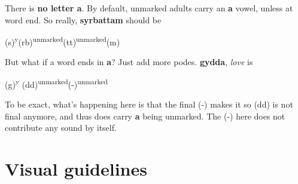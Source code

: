 \documentclass[10pt,oneside]{memoir}
\begin{document}
There is \textbf{no letter a}. By default, unmarked adults carry an \textbf{a} vowel, unless at word end. So really, \textbf{syrbattam} should be

\begin{center}
    \Large (s)\textsuperscript{y}(rb)\textsuperscript{unmarked}(tt)\textsuperscript{unmarked}(m)
\end{center}

But what if a word ends in \textbf{a}? Just add more podes. \textbf{gydda}, \emph{love} is

\begin{center}
    \Large (g)\textsuperscript{y} (dd)\textsuperscript{unmarked}(-)\textsuperscript{unmarked}
\end{center}

To be exact, what's happening here is that the final (-) makes it so (dd) is not final anymore, and thus does carry \textbf{a} being unmarked. The (-) here does not contribute any sound by itself.

\section{Visual guidelines}

\vfill
\end{document}
